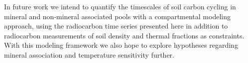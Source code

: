 \documentclass[english,man,floatsintext]{apa6}
\begin{document}
In future work we intend to quantify the timescales of soil carbon cycling in mineral and non-mineral associated pools with a compartmental modeling approach, using the radiocarbon time series presented here in addition to radiocarbon measurements of soil density and thermal fractions as constraints. With this modeling framework we also hope to explore hypotheses regarding mineral association and temperature sensitivity further.


\clearpage
\renewcommand{\listfigurename}{Figure captions}
\end{document}
